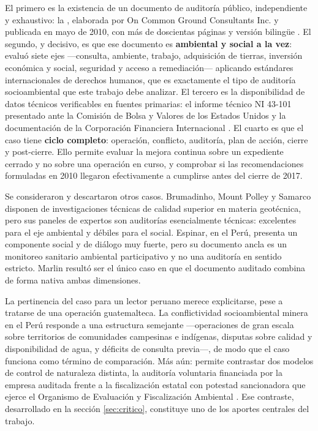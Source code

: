 El primero es la existencia de un documento de auditoría público, independiente y
exhaustivo: la \hria, elaborada por On Common Ground Consultants Inc. y publicada
en mayo de 2010, con más de doscientas páginas y versión bilingüe
\parencite{oncommonground2010hria}. El segundo, y decisivo, es que ese documento
es \textbf{ambiental y social a la vez}: evaluó siete ejes —consulta, ambiente,
trabajo, adquisición de tierras, inversión económica y social, seguridad y acceso
a remediación— aplicando estándares internacionales de derechos humanos, que es
exactamente el tipo de auditoría socioambiental que este trabajo debe analizar. El
tercero es la disponibilidad de datos técnicos verificables en fuentes primarias:
el informe técnico NI 43-101 presentado ante la Comisión de Bolsa y Valores de los
Estados Unidos \parencite{sec2011ni43101} y la documentación de la Corporación
Financiera Internacional \parencite{ifcsfmarlin}. El cuarto es que el caso tiene
\textbf{ciclo completo}: operación, conflicto, auditoría, plan de acción, cierre y
post-cierre. Ello permite evaluar la mejora continua sobre un expediente cerrado y
no sobre una operación en curso, y comprobar si las recomendaciones formuladas en
2010 llegaron efectivamente a cumplirse antes del cierre de 2017.

Se consideraron y descartaron otros casos. Brumadinho, Mount Polley y Samarco
disponen de investigaciones técnicas de calidad superior en materia geotécnica,
pero sus paneles de expertos son auditorías esencialmente técnicas: excelentes
para el eje ambiental y débiles para el social. Espinar, en el Perú, presenta un
componente social y de diálogo muy fuerte, pero su documento ancla es un monitoreo
sanitario ambiental participativo y no una auditoría en sentido estricto. Marlin
resultó ser el único caso en que el documento auditado combina de forma nativa
ambas dimensiones.

La pertinencia del caso para un lector peruano merece explicitarse, pese a
tratarse de una operación guatemalteca. La conflictividad socioambiental minera en
el Perú responde a una estructura semejante —operaciones de gran escala sobre
territorios de comunidades campesinas e indígenas, disputas sobre calidad y
disponibilidad de agua, y déficits de consulta previa—, de modo que el caso
funciona como término de comparación. Más aún: permite contrastar dos modelos de
control de naturaleza distinta, la auditoría voluntaria financiada por la empresa
auditada frente a la fiscalización estatal con potestad sancionadora que ejerce el
Organismo de Evaluación y Fiscalización Ambiental
\parencite{congreso2009ley29325}. Ese contraste, desarrollado en la sección
\ref{sec:critico}, constituye uno de los aportes centrales del trabajo.

